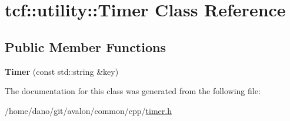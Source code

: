 \hypertarget{classtcf_1_1utility_1_1Timer}{}\section{tcf\+:\+:utility\+:\+:Timer Class Reference}
\label{classtcf_1_1utility_1_1Timer}
\subsection*{Public Member Functions}
\begin{DoxyCompactItemize}
\item 
\mbox{\label{classtcf_1_1utility_1_1Timer_a49103624219f11d58a0ba6fa0b9f7957}} 
{\bfseries Timer} (const std\+::string \&key)
\end{DoxyCompactItemize}


The documentation for this class was generated from the following file\+:\begin{DoxyCompactItemize}
\item 
/home/dano/git/avalon/common/cpp/\hyperlink{timer_8h}{timer.\+h}\end{DoxyCompactItemize}
